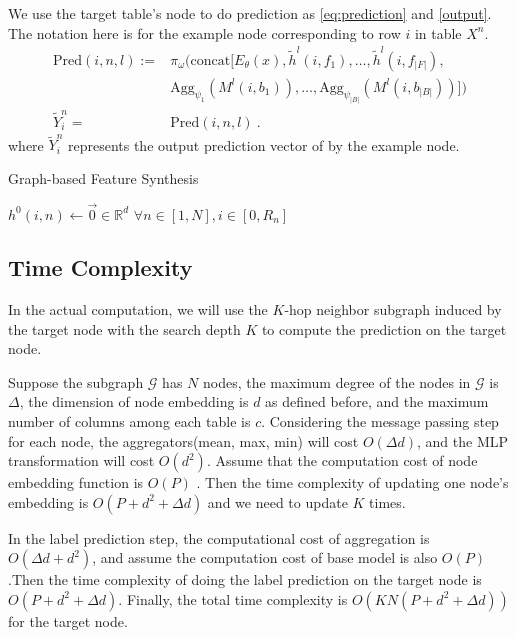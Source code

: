 We use the target table's node to do prediction as \eqref{eq:prediction} and \eqref{output}. The notation here is for the example node corresponding to row $i$ in table $X^n$. 
\begin{align}
\text{Pred}(i, n, l) :=& \pi_{\omega}\big(\text{concat}[E_\theta(x),\tilde{h}^{l}(i, f_1), \ldots , \tilde{h}^{l}(i, f_{|F|}),\label{eq:prediction}\\ 
&\text{Agg}_{\psi_1}(M^{l}(i, b_1)), \ldots, \text{Agg}_{\psi_{|B|}}(M^{l}(i, b_{|B|}))]\big)\nonumber \\
\tilde{Y}^n_i =& \text{Pred}(i, n, l)~. \label{output}
\end{align}
where $\tilde{Y}^n_i$ represents the output prediction vector of \model{} by the example node.

\begin{algorithm}
\caption{Graph-based Feature Synthesis}\label{algo:GFS}
$h^0(i,n)\leftarrow\Vec{0}\in \mathbb{R}^d\,\,\forall n\in[1, N], i\in[0, R_n]$\\
\end{algorithm}

\subsection{\model{} Time Complexity}
In the actual computation, we will use the $K$-hop neighbor subgraph induced by the target node with the search depth $K$ to compute the prediction on the target node. 

Suppose the subgraph $\mathcal{G}$ has $N$ nodes, the maximum degree of the nodes in $\mathcal{G}$ is $\Delta$, the dimension of node embedding is $d$ as defined before, and the maximum number of columns among each table is $c$.
Considering the message passing step for each node, the aggregators(mean, max, min) will cost $O(\Delta d)$, and the MLP transformation will cost $O(d^2)$. Assume that the computation cost of node embedding function is $O(P)$ 
. Then the time complexity of updating one node's embedding is $O(P+d^2+\Delta d)$ and we need to update $K$ times.

In the label prediction step, the computational cost of aggregation is $O(\Delta d+d^2)$, and assume the computation cost of base model is also $O(P)$.Then the time complexity of doing the label prediction on the target node is $O(P+d^2+\Delta d)$.
Finally, the total time complexity is $O(KN(P+d^2+\Delta d))$ for the target node. 

